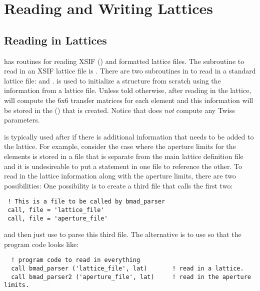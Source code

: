 \chapter{Reading and Writing Lattices}

\section{Reading in Lattices}
\label{s:lat.readin}


\bmad has routines for reading XSIF () and
\bmad formatted lattice files. The subroutine to read in an XSIF lattice
file is . There are two subroutines in \bmad to read
in a \bmad standard lattice file:  and
.  is used to initialize a
 structure from scratch using the information from a
lattice file. Unless told otherwise, after reading in the lattice,
 will compute the 6x6 transfer matrices for each element
and this information will be stored in the 
() that is created.  Notice that 
does {\em not} compute any Twiss parameters.

 is typically used after  if there is
additional information that needs to be added to the lattice. For
example, consider the case where the aperture limits for the elements 
is stored in a file that is separate from the main lattice definition
file and it is undesireable to put a  statement in one file
to reference the other.
To read in the lattice information along with the aperture limits, 
there are two possibilities: One possibility 
is to create a third file that calls the first two:
\begin{verbatim}
 ! This is a file to be called by bmad_parser
 call, file = 'lattice_file'
 call, file = 'aperture_file'
\end{verbatim}
and then just use  to parse this third file. The
alternative is to use  so that the program code looks
like:
\begin{verbatim}
  ! program code to read in everything
  call bmad_parser ('lattice_file', lat)       ! read in a lattice.
  call bmad_parser2 ('aperture_file', lat)     ! read in the aperture limits.
\end{verbatim}


